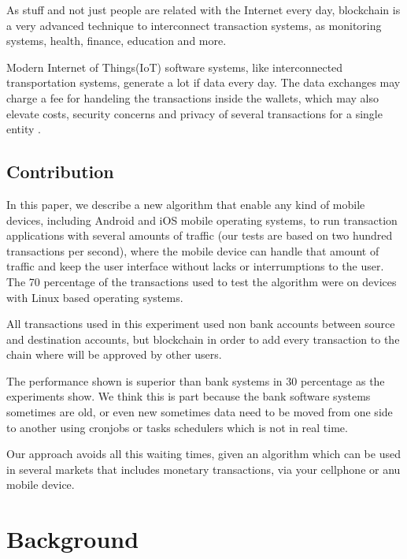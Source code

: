 \documentclass[journal]{IEEEtran}
\begin{document}
As stuff and not just people are related with the Internet every day, blockchain is a very advanced technique to interconnect transaction systems, as monitoring systems, health, finance, education and more.

Modern Internet of Things(IoT) software systems, like interconnected transportation systems, generate a lot if data every day. The data exchanges may charge a fee for handeling the transactions inside the wallets, which may also elevate costs, security concerns and privacy of several transactions for a single entity \cite{TQiu2017}. 

\subsection{Contribution}
In this paper, we describe a new algorithm that enable any kind of mobile devices, including Android and iOS mobile operating systems, to run transaction applications with several amounts of traffic (our tests are based on two hundred transactions per second), where the mobile device can handle that amount of traffic and keep the user interface without lacks or interrumptions to the user. The 70 percentage of the transactions used to test the algorithm were on devices with Linux based operating systems.

All transactions used in this experiment used non bank accounts between source and destination accounts, but blockchain in order to add every transaction to the chain where will be approved by other users. 

The performance shown is superior than bank systems in 30 percentage as the experiments show. We think this is part because the bank software systems sometimes are old, or even new sometimes data need to be moved from one side to another using cronjobs or tasks schedulers which is not in real time.

Our approach avoids all this waiting times, given an algorithm which can be used in several markets that includes monetary transactions, via your cellphone or anu mobile device.


\section{Background}
\end{document}
